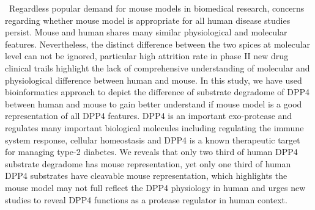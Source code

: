 \ Regardless popular demand for mouse models in biomedical research, concerns regarding whether mouse model is appropriate for all human disease studies persist. Mouse and human shares many similar physiological and molecular features. Nevertheless, the distinct difference between the two spices at molecular level can not be ignored, particular high attrition rate in phase II new drug clinical trails highlight the lack of comprehensive understanding of molecular and physiological difference between human and mouse. In this study, we have used bioinformatics approach to depict the difference of substrate degradome of DPP4 between human and mouse to gain better understand if mouse model is a good representation of all DPP4 features. DPP4 is an important exo-protease and regulates many important biological molecules including regulating the immune system response, cellular homeostasis and DPP4 is a known therapeutic target for managing type-2 diabetes. We reveals that only two third of human DPP4 substrate degradome has mouse representation, yet only one third of human DPP4 substrates have cleavable mouse representation, which highlights the mouse model may not full reflect the DPP4 physiology in human and urges new studies to reveal DPP4 functions as a protease regulator in human context. 
